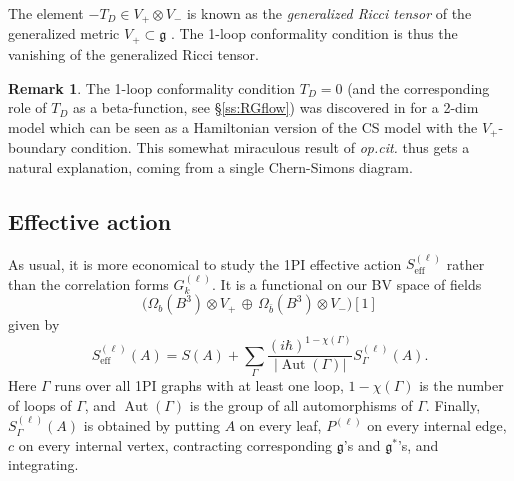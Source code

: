 \documentclass[a4paper]{amsart}
\theoremstyle{plain}
\theoremstyle{definition}
\newtheorem*{rem}{Remark}
\newcommand{\on}{\operatorname}
\newcommand{\g}{\mathfrak{g}}
\newcommand{\la}{\langle}
\newcommand{\ra}{\rangle}
\newcommand{\cf}{\mathsf{Conf}}
\begin{document}
The element $-T_{D}\in V_+\otimes V_-$ is known as the \emph{generalized Ricci tensor} of the generalized metric $V_+\subset\g$ \cite{CSW,G,SV,???}. The 1-loop conformality condition is thus the vanishing of the generalized Ricci tensor. %

\begin{rem}
The 1-loop conformality condition $T_D=0$ (and the corresponding role of $T_D$ as a beta-function, see \S\ref{ss:RGflow}) was discovered in \cite{SST} for a 2-dim model which can be seen as a Hamiltonian version of the CS model with the $V_+$-boundary condition. This somewhat miraculous result of \emph{op.cit.} thus gets a natural explanation, coming from a single Chern-Simons diagram.
\end{rem}

\subsection{Effective action}
As usual, it is more economical to study the  1PI effective action $S^{(\ell)}_\text{eff}$ rather than the correlation forms $G_k^{(\ell)}$. It is a functional on our BV space of fields
$$\bigl(\Omega_b(B^3)\otimes V_+\, \oplus\, \Omega_{\bar b}(B^3)\otimes V_-\bigr)[1] $$
given by
$$S^{(\ell)}_\text{eff}(A)= S(A) + 
\sum_\Gamma \frac{(i\hbar)^{1-\chi(\Gamma)}}{|\on{Aut}(\Gamma)|} S_\Gamma^{(\ell)}(A).$$
Here $\Gamma$ runs over all 1PI graphs with at least one loop, $1-\chi(\Gamma)$ is the number of loops of $\Gamma$, and $\on{Aut}(\Gamma)$ is the group of all automorphisms of $\Gamma$. Finally, $S_\Gamma^{(\ell)}(A)$ is obtained by putting $A$ on every leaf, $P^{(\ell)}$ on every internal edge, $c$ on every internal vertex, contracting corresponding $\g$'s and $\g^*$'s, and integrating.


\end{document}

